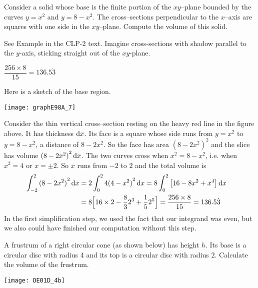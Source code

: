 \begin{question}[1998A] %
Consider a solid whose base is the finite portion of the
$xy$--plane bounded by the curves $y=x^2$ and $y=8-x^2$. The cross--sections
perpendicular to the $x$--axis are squares with one side in the $xy$--plane.
Compute the volume of this solid.
\end{question}

\begin{hint}
See Example  in the
CLP-2 text. Imagine cross-sections with shadow parallel to the $y$-axis, sticking straight out of the $xy$-plane.
\end{hint}

\begin{answer}
 $\dfrac{256\times 8}{15}=136.5\dot3$
\end{answer}

\begin{solution}
Here is a sketch of the base region.

\begin{center}
       \texttt{[image: graphE98A\_7]}
\end{center}

\noindent
Consider the thin vertical cross--section resting on the heavy red
line in the figure above. It has thickness $\mathrm{d}x$. Its face is a square
whose side runs from $y=x^2$ to $y=8-x^2$, a distance of $8-2x^2$. So the
face has area ${(8-2x^2)}^2$ and the slice has volume ${(8-2x^2)}^2\,\mathrm{d}x$. The two
curves cross when $x^2=8-x^2$, i.e. when $x^2=4$ or $x=\pm 2$. So $x$ runs
from $-2$ to $2$ and the total volume is
\begin{align*}
\int_{-2}^{2}{(8-2x^2)}^2\,\mathrm{d}x&=2\int_0^2 4{(4-x^2)}^2\,\mathrm{d}x
=8\int_0^2\big[16-8x^2+x^4\big]\,\mathrm{d}x\cr
&=8\Big[16\times 2-\frac{8}{3}2^3+\frac{1}{5}2^5\Big]
=\frac{256\times 8}{15}=136.5\dot3
\end{align*}
In the first simplification step, we used the fact that our integrand was even, but we also could have finished our computation without this step.
\end{solution}

\begin{Mquestion}[2001D] %
A frustrum of a right circular cone (as shown below) has
height $h$. Its base is a circular disc with radius $4$ and its top is
a circular disc with radius $2$. Calculate the volume of the frustrum.
\begin{center}
       \texttt{[image: OE01D\_4b]}
\end{center}
\end{Mquestion}

